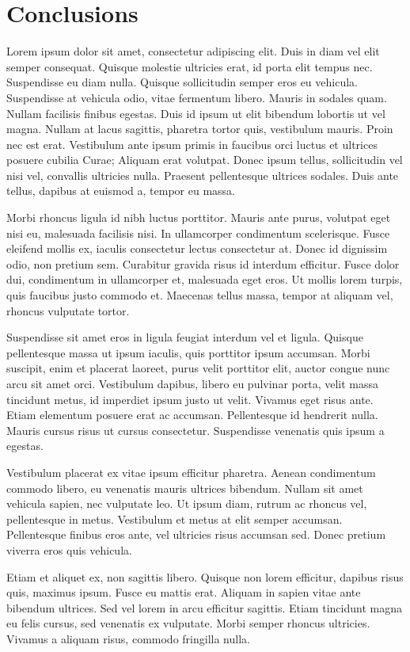 \section{Conclusions}

Lorem ipsum dolor sit amet, consectetur adipiscing elit. Duis in diam vel elit semper consequat. Quisque molestie ultricies erat, id porta elit tempus nec. Suspendisse eu diam nulla. Quisque sollicitudin semper eros eu vehicula. Suspendisse at vehicula odio, vitae fermentum libero. Mauris in sodales quam. Nullam facilisis finibus egestas. Duis id ipsum ut elit bibendum lobortis ut vel magna. Nullam at lacus sagittis, pharetra tortor quis, vestibulum mauris. Proin nec est erat. Vestibulum ante ipsum primis in faucibus orci luctus et ultrices posuere cubilia Curae; Aliquam erat volutpat. Donec ipsum tellus, sollicitudin vel nisi vel, convallis ultricies nulla. Praesent pellentesque ultrices sodales. Duis ante tellus, dapibus at euismod a, tempor eu massa.

Morbi rhoncus ligula id nibh luctus porttitor. Mauris ante purus, volutpat eget nisi eu, malesuada facilisis nisi. In ullamcorper condimentum scelerisque. Fusce eleifend mollis ex, iaculis consectetur lectus consectetur at. Donec id dignissim odio, non pretium sem. Curabitur gravida risus id interdum efficitur. Fusce dolor dui, condimentum in ullamcorper et, malesuada eget eros. Ut mollis lorem turpis, quis faucibus justo commodo et. Maecenas tellus massa, tempor at aliquam vel, rhoncus vulputate tortor.

Suspendisse sit amet eros in ligula feugiat interdum vel et ligula. Quisque pellentesque massa ut ipsum iaculis, quis porttitor ipsum accumsan. Morbi suscipit, enim et placerat laoreet, purus velit porttitor elit, auctor congue nunc arcu sit amet orci. Vestibulum dapibus, libero eu pulvinar porta, velit massa tincidunt metus, id imperdiet ipsum justo ut velit. Vivamus eget risus ante. Etiam elementum posuere erat ac accumsan. Pellentesque id hendrerit nulla. Mauris cursus risus ut cursus consectetur. Suspendisse venenatis quis ipsum a egestas.

Vestibulum placerat ex vitae ipsum efficitur pharetra. Aenean condimentum commodo libero, eu venenatis mauris ultrices bibendum. Nullam sit amet vehicula sapien, nec vulputate leo. Ut ipsum diam, rutrum ac rhoncus vel, pellentesque in metus. Vestibulum et metus at elit semper accumsan. Pellentesque finibus eros ante, vel ultricies risus accumsan sed. Donec pretium viverra eros quis vehicula.

Etiam et aliquet ex, non sagittis libero. Quisque non lorem efficitur, dapibus risus quis, maximus ipsum. Fusce eu mattis erat. Aliquam in sapien vitae ante bibendum ultrices. Sed vel lorem in arcu efficitur sagittis. Etiam tincidunt magna eu felis cursus, sed venenatis ex vulputate. Morbi semper rhoncus ultricies. Vivamus a aliquam risus, commodo fringilla nulla.